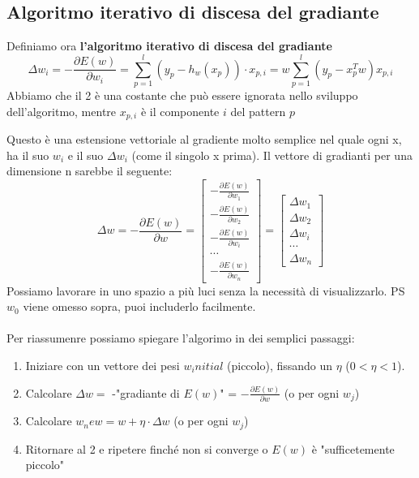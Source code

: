 \subsection{Algoritmo iterativo di discesa del gradiante}
\begin{definition}
    Definiamo ora \textbf{l'algoritmo iterativo di discesa del gradiante}
    $$\Delta w_i = -\frac{\partial E(w)}{\partial w_i} = \sum_{p=1}^{l}(y_p - h_w(x_p)) \cdot x_{p,i} = w\sum_{p=1}^{l}(y_p - x_p^T w)x_{p,i}$$
    Abbiamo che il 2 è una costante che può essere ignorata nello sviluppo dell'algoritmo, mentre $x_{p,i}$ è il componente $i$ del pattern $p$
\end{definition}
\hspace{-15pt}Questo è una estensione vettoriale al gradiente molto semplice nel quale ogni x, ha il suo $w_i$ e il suo $\Delta w_i$ (come il singolo x prima).
Il vettore di gradianti per una dimensione n sarebbe il seguente:
$$
\Delta w = -\frac{\partial E(w)}{\partial w} = 
\begin{bmatrix}
    -\frac{\partial E(w)}{\partial w_1}\\
    -\frac{\partial E(w)}{\partial w_2}\\
    -\frac{\partial E(w)}{\partial w_i}\\
    \cdots\\
    -\frac{\partial E(w)}{\partial w_n}
\end{bmatrix}
= 
\begin{bmatrix}
    \Delta w_1\\
    \Delta w_2\\
    \Delta w_i\\
    \cdots \\
    \Delta w_n
\end{bmatrix}
$$
Possiamo lavorare in uno spazio a più luci senza la necessità di visualizzarlo. PS $w_0$ viene omesso sopra, puoi includerlo facilmente.\\\\
Per riassumenre possiamo spiegare l'algorimo in dei semplici passaggi:
\begin{enumerate}
    \item Iniziare con un vettore dei pesi $w_initial$ (piccolo), fissando un $\eta$ ($0 < \eta < 1$).
    \item Calcolare $\Delta w =$ -"gradiante di $E(w)$" = $-\frac{\partial E(w)}{\partial w}$ (o per ogni $w_j$)
    \item Calcolare $w_new = w + \eta \cdot \Delta w$ (o per ogni $w_j$) 
    \item Ritornare al 2 e ripetere finché non si converge o $E(w)$ è "sufficetemente piccolo"
\end{enumerate}
